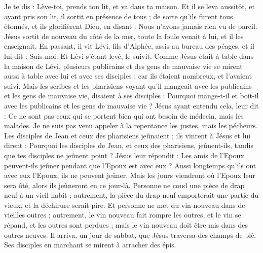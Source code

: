 \begin{multicols}{2}
Je te dis : Lève-toi, prends ton lit, et va dans ta maison.
Et il se leva aussitôt, et ayant pris son lit, il sortit en présence de tous ; de sorte qu'ils furent tous étonnés, et ils glorifièrent Dieu, en disant : Nous n’avons jamais rien vu de pareil.
Jésus sortit de nouveau du côté de la mer, toute la foule venait à lui, et il les enseignait.
En passant, il vit Lévi, fils d'Alphée, assis au bureau des péages, et il lui dit : Suis-moi. Et Lévi s'étant levé, le suivit.
Comme Jésus était à table dans la maison de Lévi, plusieurs publicains et des gens de mauvaise vie se mirent aussi à table avec lui et avec ses disciples ; car ils étaient nombreux, et l'avaient suivi.
Mais les scribes et les pharisiens voyant qu'il mangeait avec les publicains et les gens de mauvaise vie, disaient à ses disciples : Pourquoi mange-t-il et boit-il avec les publicains et les gens de mauvaise vie ?
Jésus ayant entendu cela, leur dit : Ce ne sont pas ceux qui se portent bien qui ont besoin de médecin, mais les malades. Je ne suis pas venu appeler à la repentance les justes, mais les pécheurs.
Les disciples de Jean et ceux des pharisiens jeûnaient ; ils vinrent à Jésus et lui dirent : Pourquoi les disciples de Jean, et ceux des pharisiens, jeûnent-ils, tandis que tes disciples ne jeûnent point ?
Jésus leur répondit : Les amis de l'Epoux peuvent-ils jeûner pendant que l'Epoux est avec eux ? Aussi longtemps qu’ils ont avec eux l'Epoux, ils ne peuvent jeûner.
Mais les jours viendront où l'Epoux leur sera ôté, alors ils jeûneront en ce jour-là.
Personne ne coud une pièce de drap neuf à un vieil habit ; autrement, la pièce du drap neuf emporterait une partie du vieux, et la déchirure serait pire.
Et personne ne met du vin nouveau dans de vieilles outres ; autrement, le vin nouveau fait rompre les outres, et le vin se répand, et les outres sont perdues ; mais le vin nouveau doit être mis dans des outres neuves.
Il arriva, un jour de sabbat, que Jésus traversa des champs de blé. Ses disciples en marchant se mirent à arracher des épis.

\end{multicols}

